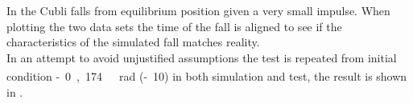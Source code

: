 \begin{minipage}{\linewidth}
\begin{minipage}{0.45\linewidth}
\begin{figure}[H]
			\centering
			\captionsetup{justification=centering}
			\label{FallTestComparison10deg}
		\end{figure}\vspace{-5mm}
	\end{minipage}
\end{minipage}

In  the Cubli falls from equilibrium position given a very small impulse. When plotting the two data sets the time of the fall is aligned to see if the characteristics of the simulated fall matches reality.\\
In an attempt to avoid unjustified assumptions the test is repeated from initial condition \si{-0,174\ rad} (\si{-10^\circ}) in both simulation and test, the result is shown in .

